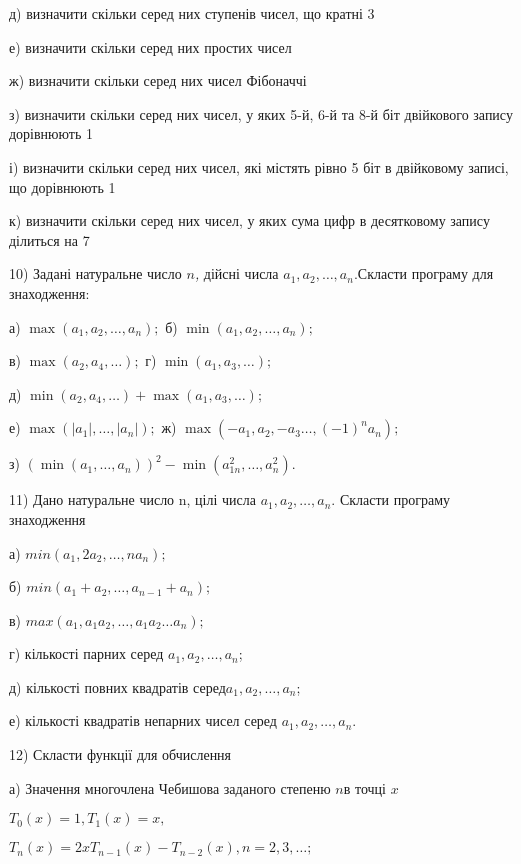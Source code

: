 \documentclass[]{article}
\begin{document}
д) визначити скільки серед них ступенів чисел, що кратні 3

е) визначити скільки серед них простих чисел

ж) визначити скільки серед них чисел Фібоначчі

з) визначити скільки серед них чисел, у яких 5-й, 6-й та 8-й біт
двійкового запису дорівнюють 1

і) визначити скільки серед них чисел, які містять рівно 5 біт в
двійковому записі, що дорівнюють 1

к) визначити скільки серед них чисел, у яких сума цифр в десятковому
запису ділиться на 7

10) Задані натуральне число \(n\)\emph{,} дійсні числа
\(a_{1},a_{2},\ldots,a_{n}.\)Скласти програму для знаходження:

а) \(\max\left( a_{1},a_{2},\ldots,a_{n} \right);\) б)
\(\min\left( a_{1},a_{2},\ldots,a_{n} \right);\)

в) \(\max\left( a_{2},a_{4},\ldots \right);\) г)
\(\min\left( a_{1},a_{3},\ldots \right);\)

д)
\(\min\left( a_{2},a_{4},\ldots \right) + \max\left( a_{1},a_{3},\ldots \right);\)

е)
\(\max\left( \left| a_{1} \right|,\ldots,\left| a_{n} \right| \right);\)
ж) \(\max\left( - a_{1},a_{2}, - a_{3}\ldots,( - 1)^{n}a_{n} \right);\)

з)
\(\left( \min\left( a_{1},\ldots,a_{n} \right) \right)^{2} - \min\left( a_{1n}^{2},\ldots,a_{n}^{2} \right).\)

11) Дано натуральне число n, цілі числа \(a_{1},a_{2},\ldots,a_{n}.\)
Скласти програму знаходження

а) \(min(a_{1},2a_{2},\ldots,na_{n});\)

б) \(min(a_{1} + a_{2},\ldots,a_{n - 1} + a_{n});\)

в) \(max(a_{1},a_{1}a_{2},\ldots,a_{1}a_{2}\ldots a_{n});\)

г) кількості парних серед \(a_{1},a_{2},\ldots,a_{n}\);

д) кількості повних квадратів серед\(a_{1},a_{2},\ldots,a_{n}\);

е) кількості квадратів непарних чисел серед
\(a_{1},a_{2},\ldots,a_{n}.\)

12) Скласти функції для обчислення

а) Значення многочлена Чебишова заданого степеню \(n\)в точці \(x\)

\(T_{0}(x) = 1,T_{1}(x) = x,\)

\(T_{n}(x) = 2xT_{n - 1}(x) - T_{n - 2}(x),n = 2,3,\ldots;\)
\end{document}
